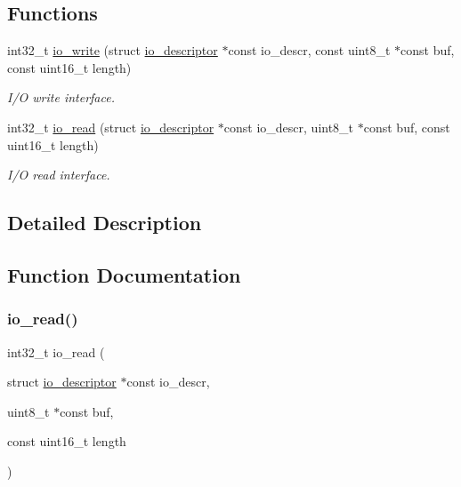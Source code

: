 \subsection*{Functions}
\begin{DoxyCompactItemize}
\item 
int32\+\_\+t \hyperlink{group__doc__driver__hal__helper__io_ga81aac60d5ce6feb0c44f8937d7c02f14}{io\+\_\+write} (struct \hyperlink{structio__descriptor}{io\+\_\+descriptor} $\ast$const io\+\_\+descr, const uint8\+\_\+t $\ast$const buf, const uint16\+\_\+t length)
\begin{DoxyCompactList}\small\item\em I/O write interface. \end{DoxyCompactList}\item 
int32\+\_\+t \hyperlink{group__doc__driver__hal__helper__io_gaf5e8722129933fa8e014144fd7505be6}{io\+\_\+read} (struct \hyperlink{structio__descriptor}{io\+\_\+descriptor} $\ast$const io\+\_\+descr, uint8\+\_\+t $\ast$const buf, const uint16\+\_\+t length)
\begin{DoxyCompactList}\small\item\em I/O read interface. \end{DoxyCompactList}\end{DoxyCompactItemize}


\subsection{Detailed Description}


\subsection{Function Documentation}
\mbox{\label{group__doc__driver__hal__helper__io_gaf5e8722129933fa8e014144fd7505be6}} 
\subsubsection{\texorpdfstring{io\+\_\+read()}{io\_read()}}
{\footnotesize\ttfamily int32\+\_\+t io\+\_\+read (\begin{DoxyParamCaption}\item[{struct \hyperlink{structio__descriptor}{io\+\_\+descriptor} $\ast$const}]{io\+\_\+descr,  }\item[{uint8\+\_\+t $\ast$const}]{buf,  }\item[{const uint16\+\_\+t}]{length }\end{DoxyParamCaption})}



